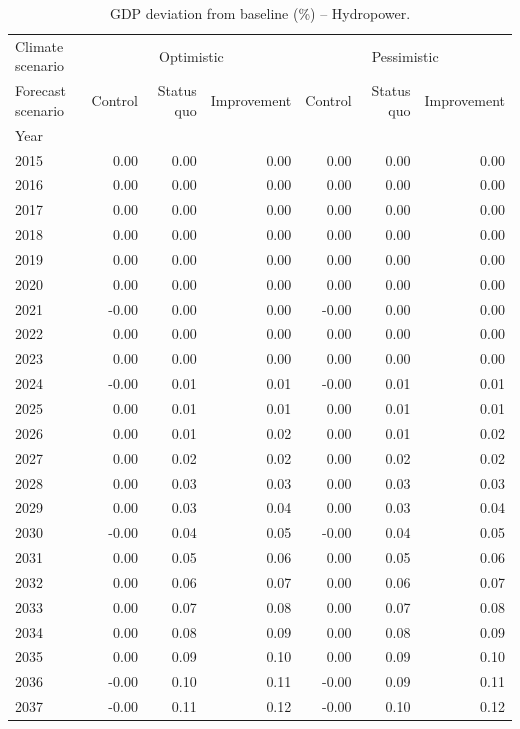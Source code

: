 \begin{table}
\caption{GDP deviation from baseline (\%) -- Hydropower.}
\label{tab:results_HYD_baseline_rel}
\centering
\begin{tabular}{lrrrrrr}
\toprule
Climate scenario & \multicolumn{3}{c}{Optimistic} & \multicolumn{3}{c}{Pessimistic} \\
Forecast scenario & Control & Status quo & Improvement & Control & Status quo & Improvement \\
Year &  &  &  &  &  &  \\
\midrule
2015 & 0.00 & 0.00 & 0.00 & 0.00 & 0.00 & 0.00 \\
2016 & 0.00 & 0.00 & 0.00 & 0.00 & 0.00 & 0.00 \\
2017 & 0.00 & 0.00 & 0.00 & 0.00 & 0.00 & 0.00 \\
2018 & 0.00 & 0.00 & 0.00 & 0.00 & 0.00 & 0.00 \\
2019 & 0.00 & 0.00 & 0.00 & 0.00 & 0.00 & 0.00 \\
2020 & 0.00 & 0.00 & 0.00 & 0.00 & 0.00 & 0.00 \\
2021 & -0.00 & 0.00 & 0.00 & -0.00 & 0.00 & 0.00 \\
2022 & 0.00 & 0.00 & 0.00 & 0.00 & 0.00 & 0.00 \\
2023 & 0.00 & 0.00 & 0.00 & 0.00 & 0.00 & 0.00 \\
2024 & -0.00 & 0.01 & 0.01 & -0.00 & 0.01 & 0.01 \\
2025 & 0.00 & 0.01 & 0.01 & 0.00 & 0.01 & 0.01 \\
2026 & 0.00 & 0.01 & 0.02 & 0.00 & 0.01 & 0.02 \\
2027 & 0.00 & 0.02 & 0.02 & 0.00 & 0.02 & 0.02 \\
2028 & 0.00 & 0.03 & 0.03 & 0.00 & 0.03 & 0.03 \\
2029 & 0.00 & 0.03 & 0.04 & 0.00 & 0.03 & 0.04 \\
2030 & -0.00 & 0.04 & 0.05 & -0.00 & 0.04 & 0.05 \\
2031 & 0.00 & 0.05 & 0.06 & 0.00 & 0.05 & 0.06 \\
2032 & 0.00 & 0.06 & 0.07 & 0.00 & 0.06 & 0.07 \\
2033 & 0.00 & 0.07 & 0.08 & 0.00 & 0.07 & 0.08 \\
2034 & 0.00 & 0.08 & 0.09 & 0.00 & 0.08 & 0.09 \\
2035 & 0.00 & 0.09 & 0.10 & 0.00 & 0.09 & 0.10 \\
2036 & -0.00 & 0.10 & 0.11 & -0.00 & 0.09 & 0.11 \\
2037 & -0.00 & 0.11 & 0.12 & -0.00 & 0.10 & 0.12 \\

\end{tabular}
\end{table}
